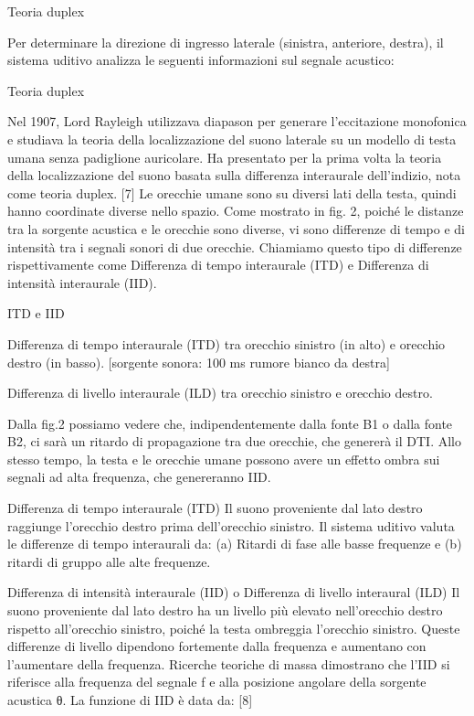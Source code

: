 Teoria duplex

Per determinare la direzione di ingresso laterale (sinistra, anteriore, destra),
il sistema uditivo analizza le seguenti informazioni sul segnale acustico:

Teoria duplex

Nel 1907, Lord Rayleigh utilizzava diapason per generare l'eccitazione monofonica
e studiava la teoria della localizzazione del suono laterale su un modello di
testa umana senza padiglione auricolare. Ha presentato per la prima volta la
teoria della localizzazione del suono basata sulla differenza interaurale dell'indizio,
nota come teoria duplex. [7] Le orecchie umane sono su diversi lati della testa,
quindi hanno coordinate diverse nello spazio. Come mostrato in fig. 2, poiché le
distanze tra la sorgente acustica e le orecchie sono diverse, vi sono differenze
di tempo e di intensità tra i segnali sonori di due orecchie. Chiamiamo questo
tipo di differenze rispettivamente come Differenza di tempo interaurale (ITD) e
Differenza di intensità interaurale (IID).

ITD e IID

Differenza di tempo interaurale (ITD) tra orecchio sinistro (in alto) e orecchio
destro (in basso). [sorgente sonora: 100 ms rumore bianco da destra]

Differenza di livello interaurale (ILD) tra orecchio sinistro e orecchio destro.

Dalla fig.2 possiamo vedere che, indipendentemente dalla fonte B1 o dalla fonte
B2, ci sarà un ritardo di propagazione tra due orecchie, che genererà il DTI.
Allo stesso tempo, la testa e le orecchie umane possono avere un effetto ombra
sui segnali ad alta frequenza, che genereranno IID.

Differenza di tempo interaurale (ITD) Il suono proveniente dal lato destro
raggiunge l'orecchio destro prima dell'orecchio sinistro. Il sistema uditivo
valuta le differenze di tempo interaurali da: (a) Ritardi di fase alle basse
frequenze e (b) ritardi di gruppo alle alte frequenze.

Differenza di intensità interaurale (IID) o Differenza di livello interaural
(ILD) Il suono proveniente dal lato destro ha un livello più elevato nell'orecchio
destro rispetto all'orecchio sinistro, poiché la testa ombreggia l'orecchio sinistro.
Queste differenze di livello dipendono fortemente dalla frequenza e aumentano con
l'aumentare della frequenza. Ricerche teoriche di massa dimostrano che l'IID si
riferisce alla frequenza del segnale f e alla posizione angolare della sorgente
acustica θ. La funzione di IID è data da: [8]

